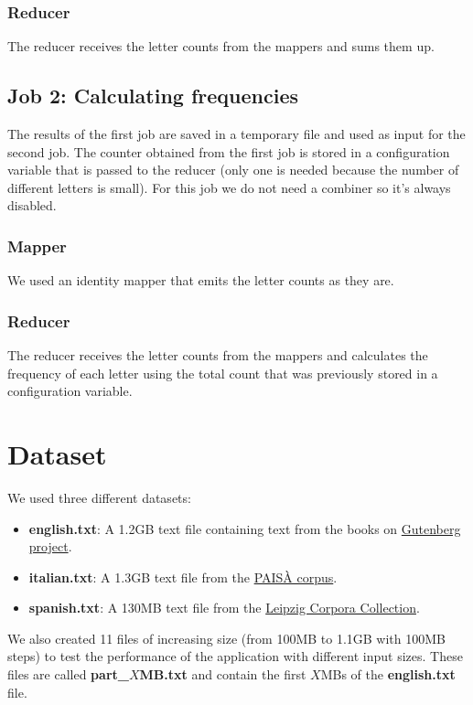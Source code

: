 \documentclass{article}
\begin{document}
\begin{multicols}{2}
        \subsubsection{Reducer}
            The reducer receives the letter counts from the mappers and sums them up.
    \subsection{Job 2: Calculating frequencies}
        The results of the first job are saved in a temporary file and used as input for the second job.
        The counter obtained from the first job is stored in a configuration variable that is passed to the 
        reducer (only one is needed because the number of different letters is small).
        For this job we do not need a combiner so it's always disabled.
        \subsubsection{Mapper}
            We used an identity mapper that emits the letter counts as they are.
        \subsubsection{Reducer}
            The reducer receives the letter counts from the mappers and calculates the frequency of each letter
            using the total count that was previously stored in a configuration variable.
\section{Dataset}
    We used three different datasets:
    \begin{itemize}
        \item \textbf{english.txt}: A 1.2GB text file containing text from the books on \href{https://www.gutenberg.org/}{Gutenberg project}.
        \item \textbf{italian.txt}: A 1.3GB text file from the \href{https://www.corpusitaliano.it/}{PAISÀ corpus}\cite{lyding-etal-2014-paisa}.
        \item \textbf{spanish.txt}: A 130MB text file from the \href{https://wortschatz.uni-leipzig.de/en/download/Spanish}{Leipzig Corpora Collection}\cite{Eckart2013}.
    \end{itemize}
    We also created 11 files of increasing size (from 100MB to 1.1GB with 100MB steps) to test the performance
    of the application with different input sizes. These files are called \textbf{part\_$X$MB.txt} and 
    contain the first $X$MBs of the \textbf{english.txt} file. 

\end{multicols}
\end{document}
